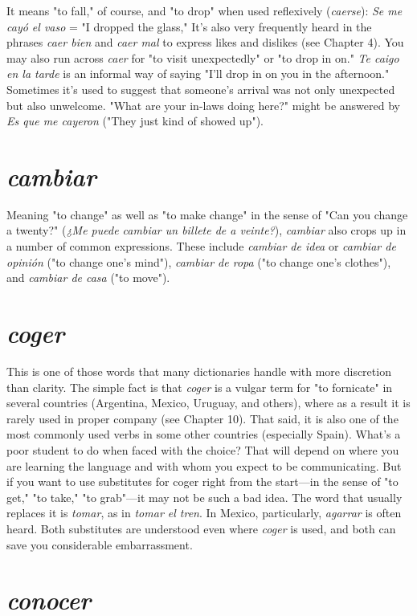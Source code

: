 \documentclass[14pt,a4paper,oneside]{memoir}
\begin{document}
It means "to fall," of course, and "to drop" when used reflexively (\emph{caerse}): \emph{Se me cayó el vaso} = "I dropped the glass," It's also
very frequently heard in the phrases \emph{caer bien} and \emph{caer mal} to express
likes and dislikes (see Chapter 4). You may also run across \emph{caer} for "to
visit unexpectedly" or "to drop in on." \emph{Te caigo en la tarde} is an informal way of saying "I'll drop in on you in the afternoon." Sometimes
it's used to suggest that someone's arrival was not only unexpected but
also unwelcome. "What are your in-laws doing here?" might be answered by \emph{Es que me cayeron} ("They just kind of showed up").

\section{\emph{cambiar}}

Meaning "to change" as well as "to make change" in the sense
of "Can you change a twenty?" (\emph{¿Me puede cambiar un billete de a
veinte?}), \emph{cambiar} also crops up in a number of common expressions.
These include \emph{cambiar de idea} or \emph{cambiar de opinión} ("to change
one's mind"), \emph{cambiar de ropa} ("to change one's clothes"), and \emph{cambiar de casa} ("to move").

\section{\emph{coger}}

This is one of those words that many dictionaries handle with
more discretion than clarity. The simple fact is that \emph{coger} is a vulgar
term for "to fornicate" in several countries (Argentina, Mexico, Uruguay, and others), where as a result it is rarely used in proper company
(see Chapter 10). That said, it is also one of the most commonly used
verbs in some other countries (especially Spain). What's a poor student
to do when faced with the choice? That will depend on where you are
learning the language and with whom you expect to be communicating. But if you want to use substitutes for coger right from the start---in the sense of "to get," "to take," "to grab"---it may not be such a bad
idea. The word that usually replaces it is \emph{tomar}, as in \emph{tomar el tren}. In
Mexico, particularly, \emph{agarrar} is often heard. Both substitutes are 
understood even where \emph{coger} is used, and both can save you considerable
embarrassment.

\section{\emph{conocer}}
\end{document}
